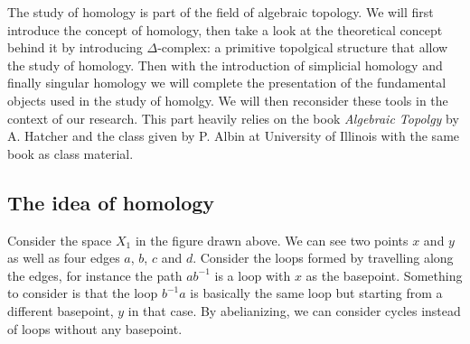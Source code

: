 \documentclass[12pt]{article}
\begin{document}
The study of homology is part of the field of algebraic topology. We will first introduce the concept of homology, then take a look at the theoretical concept behind it by introducing $\Delta$-complex: a primitive topolgical structure that allow the study of homology. Then with the introduction of simplicial homology and finally singular homology we will complete the presentation of the fundamental objects used in the study of homolgy. We will then reconsider these tools in the context of our research. This part heavily relies on the book \textit{Algebraic Topolgy} by A. Hatcher \cite{hatcher_algebraic_2002} and the class given by P. Albin at University of Illinois \cite{albin_1_2018} with the same book as class material. 

\subsection{The idea of homology}

\begin{center}
\end{center}

Consider the space $X_1$ in the figure drawn above. We can see two points $x$ and $y$ as well as four edges $a$, $b$, $c$ and $d$. Consider the loops formed by travelling along the edges, for instance the path $ab^{-1}$ is a loop with $x$ as the basepoint. Something to consider is that the loop $b^{-1}a$ is basically the same loop but starting from a different basepoint, $y$ in that case. By abelianizing, we can consider cycles instead of loops without any basepoint.\\
\end{document}
